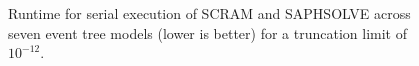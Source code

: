 \begin{figure}[]
  \centering
  
  \caption{Runtime for serial execution of SCRAM and SAPHSOLVE across seven event tree models (lower is better) for a truncation limit of $10^{-12}$.}
  \label{fig:mc_event_tree_analysis}
\end{figure}